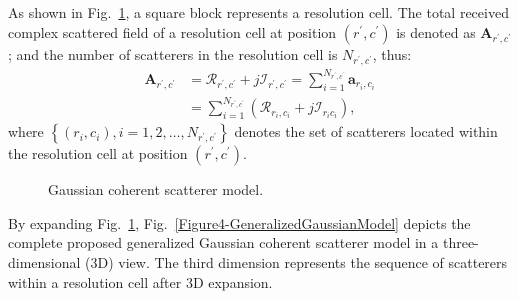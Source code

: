 \documentclass[journal]{IEEEtran}
\begin{document}
As shown in Fig.~\ref{Figure3-GaussianCoherentModel}, a square block represents a resolution cell.
The total received complex scattered field of a resolution cell at position $(r^{\prime},c^{\prime})$
is denoted as $\boldsymbol{A}_{r^{\prime},c^{\prime}}$; and the number of scatterers in the resolution cell is $N_{r^{\prime},c^{\prime} }$, thus:
\begin{align}
\boldsymbol{A}_{r^{\prime}, c^{\prime}} & =\mathcal{R}_{r^{\prime}, c^{\prime}}+j \mathcal{I}_{r^{\prime}, c^{\prime}}=\sum_{i=1}^{N_{r^{\prime}, c^{\prime}}} \boldsymbol{a}_{r_{i}, c_{i}}\nonumber \\
& =\sum_{i=1}^{N_{r^{\prime}, c^{\prime}}}\left(\mathcal{R}_{r_{i}, c_{i}}+j \mathcal{I}_{r_{i} c_{i}}\right),
\label{eq4}
\end{align}
where $\left\{\left(r_{i}, c_{i}\right), i=1,2, \dots, N_{r^{\prime}, c^{\prime}}\right\}$ denotes the set of scatterers located within the resolution cell at position $(r^{\prime},c^{\prime})$.

\begin{figure}[hbt]
\centering
\caption{Gaussian coherent scatterer model.}
\label{Figure3-GaussianCoherentModel}
\end{figure}

By expanding Fig.~\ref{Figure3-GaussianCoherentModel},
Fig.~\ref{Figure4-GeneralizedGaussianModel} depicts the complete proposed generalized Gaussian coherent scatterer model in a three-dimensional (3D) view. The third dimension represents the sequence of scatterers within a resolution cell after 3D expansion.

\begin{figure*}
\centering
\label{Figure4-GeneralizedGaussianModel}
\end{figure*}
\end{document}
